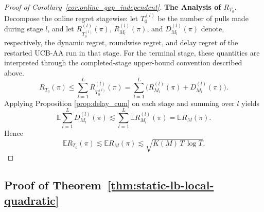 \documentclass[11pt]{article}
\begin{document}
\begin{proof}[Proof of Corollary~\ref{cor:online_gap_independent}]
\textbf{The Analysis of $R_{T_0}$.} Decompose the online regret stagewise:
let \(T_0^{(l)}\) be the number of pulls made during stage \(l\), and let
\(R_{T_0^{(l)}}^{(l)}(\pi)\), \(R_{M_l}^{(l)}(\pi)\), and
\(D_{M_l}^{(l)}(\pi)\) denote, respectively, the dynamic regret, roundwise
regret, and delay regret of the restarted UCB-AA run in that stage. For the
terminal stage, these quantities are interpreted through the completed-stage
upper-bound convention described above.
\[
R_{T_0}(\pi)\le\sum_{l=1}^L R_{T_0^{(l)}}^{(l)}(\pi)
=\sum_{l=1}^L\bigl(R_{M_l}^{(l)}(\pi)+D_{M_l}^{(l)}(\pi)\bigr).
\]
Applying Proposition \ref{prop:delay_cum} on each stage and summing over \(l\) yields
\[
\mathbb{E}\sum_{l=1}^L D_{M_l}^{(l)}(\pi)
\lesssim
\sum_{l=1}^L \mathbb{E} R_{M_l}^{(l)}(\pi)
=
\mathbb{E} R_M(\pi).
\]
Hence
\[
\mathbb{E}R_{T_0}(\pi)\lesssim \mathbb{E}R_M(\pi)
\lesssim \sqrt{K(M)\,T\,\log T}.
\]
\end{proof}


\subsection{Proof of Theorem~\ref{thm:static-lb-local-quadratic}}
\label{sec:Proof of thm:static-lb-local-quadratic}
\end{document}
